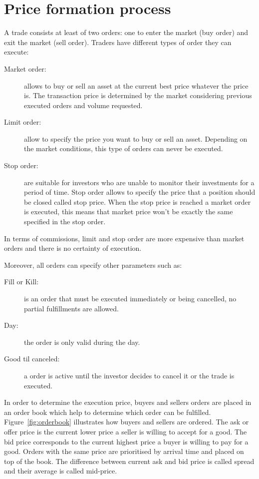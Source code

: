 \section{Price formation process}

A trade consists at least of two orders: one to enter the market (buy order) and
exit the market (sell order). Traders have different types of order they can
execute:

\begin{description}
\item[Market order:] allows to buy or sell an asset at the current best price
whatever the price is. The transaction price is determined by the market
considering previous executed orders and volume requested.
\item[Limit order:] allow to specify the price you want to buy or sell an asset.
Depending on the market conditions, this type of orders can never be executed.
\item[Stop order:] are suitable for investors who are unable to monitor their
investments for a period of time. Stop order allows to specify the price that a
position should be closed called stop price. When the stop price is reached a
market order is executed, this means that market price won't be exactly the same
specified in the stop order.
\end{description}

In terms of commissions, limit and stop order are more expensive than market orders and
there is no certainty of execution.

Moreover, all orders can specify other parameters such as: 

\begin{description}
\item[Fill or Kill:] is an order that must be executed immediately or being
cancelled, no partial fulfillments are allowed. 
\item[Day:] the order is only valid during the day.
\item[Good til canceled:] a order is active until the investor decides to cancel
it or the trade is executed.
\end{description}

In order to determine the execution price, buyers and sellers orders are placed
in an order book which help to determine which order can be fulfilled.
Figure~\ref{fig:orderbook} illustrates how buyers and sellers are ordered. The
ask or offer price is the current lower price a seller is willing to accept for
a good. The bid price corresponds to the current highest price a buyer is
willing to pay for a good. Orders with the same price are prioritised by
arrival time and placed on top of the book.  The difference between current ask and bid
price is called spread and their average is called mid-price.

